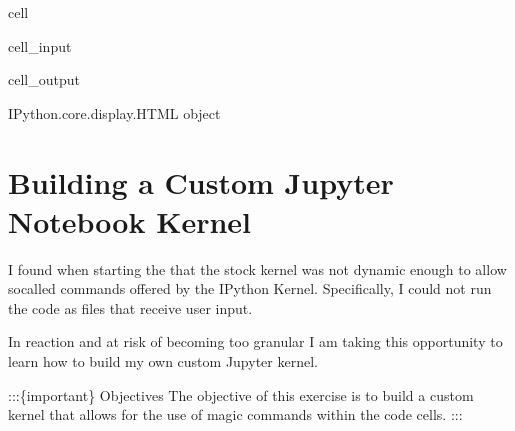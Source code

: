 \documentclass[letterpaper,12pt,english]{sphinxmanual}
\begin{document}
\begin{sphinxuseclass}{cell}
\begin{sphinxuseclass}{cell_input}
\begin{sphinxVerbatim}[commandchars=\\\{\}]
\end{sphinxVerbatim}

\end{sphinxuseclass}
\begin{sphinxuseclass}{cell_output}
\begin{sphinxVerbatim}[commandchars=\\\{\}]
\PYGZlt{}IPython.core.display.HTML object\PYGZgt{}
\end{sphinxVerbatim}

\end{sphinxuseclass}
\end{sphinxuseclass}

\chapter{Building a Custom Jupyter Notebook Kernel}
\label{\detokenize{notebooks/04-build-custom-kernel:building-a-custom-jupyter-notebook-kernel}}\label{\detokenize{notebooks/04-build-custom-kernel::doc}}
\sphinxAtStartPar
I found when starting the  that the stock  kernel was not dynamic enough to allow so\sphinxhyphen{}called  commands offered by the IPython Kernel. Specifically, I could not run the  code as files that receive user input.

\sphinxAtStartPar
In reaction \textendash{}and at risk of becoming too granular\textendash{} I am taking this opportunity to learn how to build my own custom Jupyter kernel.

\sphinxAtStartPar
:::\{important\} Objectives
The objective of this exercise is to build a custom  kernel that allows for the use of magic  commands within the  code cells.
:::
\end{document}
